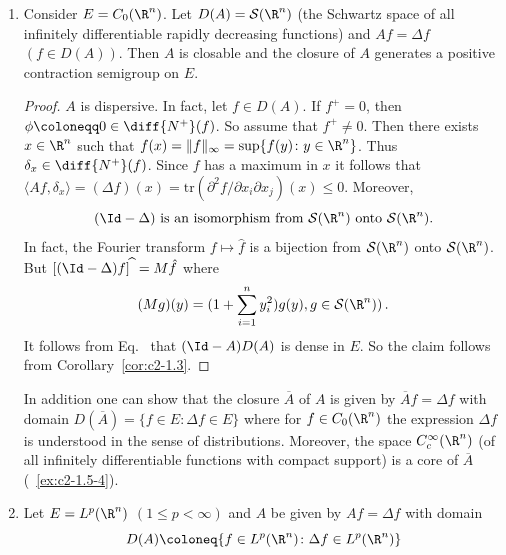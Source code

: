 \begin{examples}
\begin{enumerate}[\upshape (i), wide, labelindent=.25em]
\begin{proof}
We have shown that $A$ is dispersive. 
As in~\ref{ex:c2-1.5-1}   one shows that $(\Id - A)$ is surjective. 
Now the claim follows from Theorem~\ref{thm:c2-1.2}.
\end{proof}
\item \label{ex:c2-1.5-3} 
Consider $E = C_{0}(\R^{n})$. 
Let $D(A) = \mathcal{S}(\R^{n})$ (the Schwartz space of all infinitely differentiable rapidly decreasing functions) and $Af = \Delta f$ $(f \in D(A))$. 
Then $A$ is closable and the closure of\/ $A$ generates a positive contraction semigroup on $E$.
\begin{proof}
$A$ is dispersive. 
In fact, let $f \in D(A)$. 
If\/ $f^{+} = 0$, then $\phi \coloneqq 0 \in \diff{N^{+}}(f)$. 
So assume that $f^{+} \neq 0$. 
Then there exists $x \in \R^{n}$ such that $f(x) = \|f\|_{\infty} = \sup\{f(y) \colon y \in \R^{n}\}$. 
Thus $\delta_{x} \in \diff{N^{+}}(f)$.
Since $f$ has a maximum in $x$ it follows that $\langle Af,\delta_{x} \rangle = (\Delta f)(x) = \text{tr}(\partial^{2}f/\partial x_{i}\partial x_{j})(x) \leq 0$. 
Moreover,
\begin{equation}\label{eq:c2-1.3}
(\Id - \Delta) \text{ is an isomorphism from } \mathcal{S}(\R^{n}) \text{ onto } \mathcal{S}(\R^{n}).
\end{equation}
In fact, the Fourier transform $f \mapsto \hat{f}$ is a bijection from $\mathcal{S}(\R^{n})$ onto $\mathcal{S}(\R^{n})$.
But $[(\Id - \Delta)f]^{\widehat{\ }} = M\hat{f}$ where 
\[
(Mg)(y) = (1 + \sum_{i=1}^{n} y_{i}^{2})g(y), g \in \mathcal{S}(\R^{n}))\,.
\]
It follows from Eq.~ that $(\Id - A)D(A)$ is dense in $E$. So the claim follows from Corollary~\ref{cor:c2-1.3}.
\end{proof}
\begin{remark*}\label{rem:c2-1.2}
%
In addition one can show that the closure $\overline{A}$ of\/ $A$ is given by $\overline{A}f = \Delta f$ with domain $D(\overline{A}) = \{f \in E \colon \Delta f \in E\}$ where for
$f \in C_{0}(\R^{n})$ the expression $\Delta f$ is understood in the sense of distributions. 
Moreover, the space $C_{c}^{\infty}(\R^{n})$ (of all infinitely differentiable functions with compact support) is a core of\/ $\overline{A}$ (\cf~\ref{ex:c2-1.5-4}).
\end{remark*}
\item \label{ex:c2-1.5-4} 
Let $E = L^{p}(\R^{n})$ $(1 \leq p < \infty)$ and $A$ be given by $Af = \Delta f$ with domain 
\[
D(A) \coloneq \{f \in L^{p}(\R^{n}) \colon \Delta f \in L^{p}(\R^{n})\}
\]
\end{enumerate}
\end{examples}

